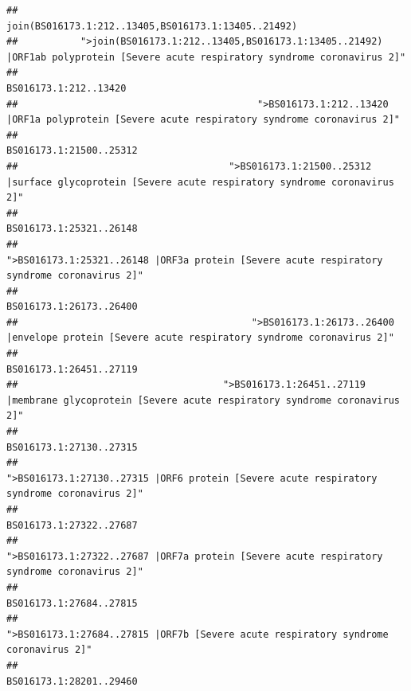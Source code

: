 \documentclass[
]{article}
\begin{document}
\begin{verbatim}
##                                                                                    join(BS016173.1:212..13405,BS016173.1:13405..21492) 
##           ">join(BS016173.1:212..13405,BS016173.1:13405..21492) |ORF1ab polyprotein [Severe acute respiratory syndrome coronavirus 2]" 
##                                                                                                                  BS016173.1:212..13420 
##                                          ">BS016173.1:212..13420 |ORF1a polyprotein [Severe acute respiratory syndrome coronavirus 2]" 
##                                                                                                                BS016173.1:21500..25312 
##                                     ">BS016173.1:21500..25312 |surface glycoprotein [Severe acute respiratory syndrome coronavirus 2]" 
##                                                                                                                BS016173.1:25321..26148 
##                                            ">BS016173.1:25321..26148 |ORF3a protein [Severe acute respiratory syndrome coronavirus 2]" 
##                                                                                                                BS016173.1:26173..26400 
##                                         ">BS016173.1:26173..26400 |envelope protein [Severe acute respiratory syndrome coronavirus 2]" 
##                                                                                                                BS016173.1:26451..27119 
##                                    ">BS016173.1:26451..27119 |membrane glycoprotein [Severe acute respiratory syndrome coronavirus 2]" 
##                                                                                                                BS016173.1:27130..27315 
##                                             ">BS016173.1:27130..27315 |ORF6 protein [Severe acute respiratory syndrome coronavirus 2]" 
##                                                                                                                BS016173.1:27322..27687 
##                                            ">BS016173.1:27322..27687 |ORF7a protein [Severe acute respiratory syndrome coronavirus 2]" 
##                                                                                                                BS016173.1:27684..27815 
##                                                    ">BS016173.1:27684..27815 |ORF7b [Severe acute respiratory syndrome coronavirus 2]" 
##                                                                                                                BS016173.1:28201..29460 

\end{verbatim}
\end{document}
